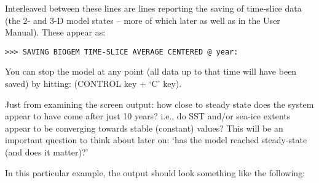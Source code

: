 Interleaved between these lines are lines reporting the saving of time-slice data (the 2- and 3-D model states – more of which later as well as in the User Manual). These appear as:

\vspace{-2mm}
\begin{verbatim}
>>> SAVING BIOGEM TIME-SLICE AVERAGE CENTERED @ year:
\end{verbatim}
\vspace{-2mm}

You can stop the model at any point (all data up to that time will have been saved) by hitting: \textsf{} (\textsf{\footnotesize CONTROL} key + ‘\textsf{\footnotesize C}’ key).

Just from examining the screen output: how close to steady state does the system appear to have come after just 10 years? i.e., do SST and/or sea-ice extents appear to be converging towards stable (constant) values? This will be an important question to think about later on: ‘has the model reached steady-state (and does it matter)?’

\newpage

\noindent In this particular example, the output should look something like the following:

